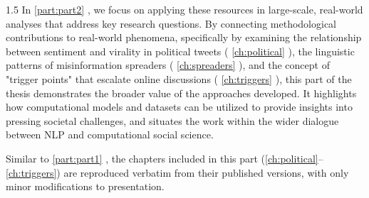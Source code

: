\documentclass[12pt,twoside]{report}
\def\subsectionautorefname{\S\!}%
\def\sectionautorefname{\S\!}%
\let\subsectionautorefname\sectionautorefname
\newcommand{\Autoref}[1]{%
  \begingroup%
  \def\chapterautorefname{Chapter}%
  \def\sectionautorefname{Section}%
  \def\subsectionautorefname{Subsection}%
  \autoref{#1}%
  \endgroup%
}
\begin{document}
\begin{flushleft}
\begin{spacing}{1.5}
In \Autoref{part:part2}, we focus on applying these resources in large-scale, real-world analyses that address key research questions. By connecting methodological contributions to real-world phenomena, specifically by examining the relationship between sentiment and virality in political tweets (\Autoref{ch:political}), the linguistic patterns of misinformation spreaders (\Autoref{ch:spreaders}), and the concept of "trigger points" that escalate online discussions (\Autoref{ch:triggers}), this part of the thesis demonstrates the broader value of the approaches developed. It highlights how computational models and datasets can be utilized to provide insights into pressing societal challenges, and situates the work within the wider dialogue between \ac{NLP} and computational social science.

Similar to \Autoref{part:part1}, the chapters included in this part (\ref{ch:political}–\ref{ch:triggers}) are reproduced verbatim from their published versions, with only minor modifications to presentation.








\end{spacing}
\end{flushleft}


% 




\fi
\end{document}
